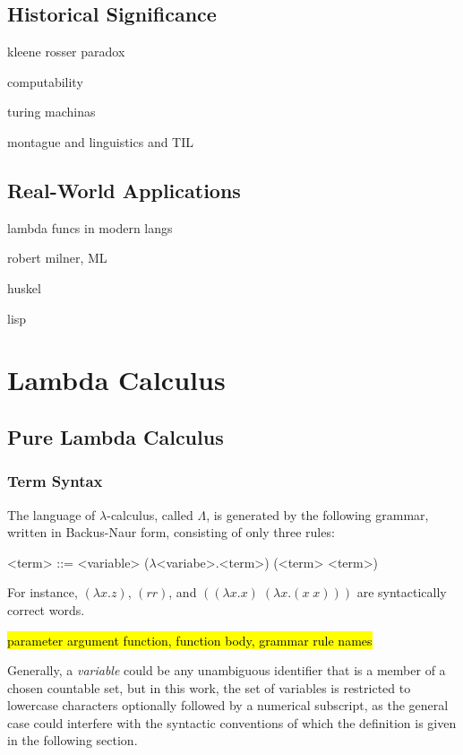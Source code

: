 \documentclass[a4paper,10pt]{article}
\begin{document}
\subsection{Historical Significance}
kleene rosser paradox

computability

turing machinas

montague and linguistics and TIL

\subsection{Real-World Applications}

lambda funcs in modern langs

robert milner, ML

huskel

lisp

\section{Lambda Calculus}
\subsection{Pure Lambda Calculus}

\subsubsection{Term Syntax}
The language of $\lambda$-calculus, called $\Lambda$, is generated by the following
grammar, written in Backus-Naur form, consisting of only three rules:
\setlength{\grammarindent}{5.2em}
\begin{grammar}
<term> ::= <variable> 
\alt ($\lambda$<variabe>.<term>) 
\alt (<term> <term>) 
\end{grammar}
For instance, $(\lambda x.z)$, $(rr)$, and $((\lambda x.x)\;(\lambda x.(x\;x)))$ are syntactically correct words.

\hl{parameter argument function, function body, grammar rule names }

Generally, a \textit{variable} could be any unambiguous identifier 
that is a member of a chosen countable set, but in this work, the set
of variables is restricted to
lowercase characters optionally followed by a numerical subscript,
as the general case could interfere with the syntactic conventions
of which the definition is given in the following section.
\end{document}
